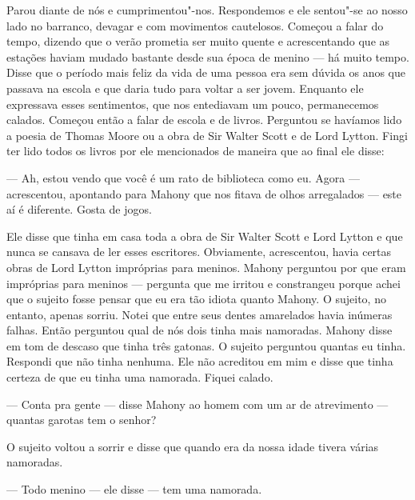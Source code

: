 Parou diante de nós e cumprimentou"-nos.  Respondemos e ele sentou"-se ao nosso
lado no barranco, devagar e com movimentos cautelosos.  Começou a falar do
tempo, dizendo que o verão prometia ser muito quente e acrescentando que as
estações haviam mudado bastante desde sua época de menino --- há muito tempo.
Disse que o período mais feliz da vida de uma pessoa era sem dúvida os anos que
passava na escola e que daria tudo para voltar a ser jovem.  Enquanto ele
expressava esses sentimentos, que nos entediavam um pouco, permanecemos
calados.  Começou então a falar de escola e de livros.  Perguntou se havíamos
lido a poesia de Thomas Moore ou a obra de Sir Walter Scott e de Lord Lytton.
Fingi ter lido todos os livros por ele mencionados de maneira que ao final ele
disse:

--- Ah, estou vendo que você é um rato de biblioteca como eu.  Agora ---
acrescentou, apontando para Mahony que nos fitava de olhos arregalados --- este
aí é diferente.  Gosta de jogos.

Ele disse que tinha em casa toda a obra de Sir Walter Scott e Lord Lytton e que
nunca se cansava de ler esses escritores.  Obviamente, acrescentou, havia
certas obras de Lord Lytton impróprias para meninos.  Mahony perguntou por que
eram impróprias para meninos --- pergunta que me irritou e constrangeu porque
achei que o sujeito fosse pensar que eu era tão idiota quanto Mahony.  O
sujeito, no entanto, apenas sorriu.  Notei que entre seus dentes amarelados
havia inúmeras falhas.  Então perguntou qual de nós dois tinha mais namoradas.
Mahony disse em tom de descaso que tinha três gatonas.  O sujeito perguntou
quantas eu tinha.  Respondi que não tinha nenhuma.  Ele não acreditou em mim e
disse que tinha certeza de que eu tinha uma namorada.  Fiquei calado.

--- Conta pra gente --- disse Mahony ao homem com um ar de atrevimento ---
quantas garotas tem o senhor?

O sujeito voltou a sorrir e disse que quando era da nossa idade tivera várias
namoradas.

--- Todo menino --- ele disse --- tem uma namorada.

